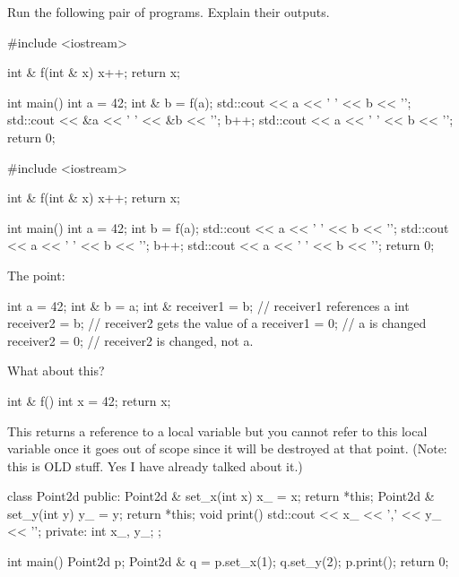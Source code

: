 Run the following pair of programs. Explain their outputs.

\begin{consolethree}[escapeinside=||]
#include <iostream>

int & f(int & x)
{
    x++;
    return x;
}

int main()
{
    int a = 42;
    int & b = f(a);
    std::cout << a << ' ' << b << '\n';
    std::cout << &a << ' ' << &b << '\n';
    b++;
    std::cout << a << ' ' << b << '\n';
    return 0;
}
\end{consolethree}

\begin{consolethree}[escapeinside=||]
#include <iostream>

int & f(int & x)
{
    x++;
    return x;
}

int main()
{
    int a = 42;
    int b = f(a);
    std::cout << a << ' ' << b << '\n';
    std::cout << a << ' ' << b << '\n';
    b++;
    std::cout << a << ' ' << b << '\n';
    return 0;
}
\end{consolethree}

The point:

\begin{consolethree}[escapeinside=||]
int a = 42;
int & b = a;
int & receiver1 = b;  // receiver1 references a
int receiver2 = b;    // receiver2 gets the value of a
receiver1 = 0;        // a is changed
receiver2 = 0;        // receiver2 is changed, not a.
\end{consolethree}

What about this?

\begin{consolethree}[escapeinside=||]
int & f()
{
    int x = 42;
    return x;
}
\end{consolethree}

This returns a reference to a local variable but you cannot refer to
this local variable once it goes out of scope since it will be destroyed
at that point. (Note: this is OLD stuff. Yes I have already talked about
it.)


\newpage{}

\begin{consolethree}[escapeinside=||]
class Point2d
{
public:
    Point2d & set_x(int x) { x_ = x; return *this; }
    Point2d & set_y(int y) { y_ = y; return *this; }
    void print()
    {
        std::cout << x_ << ',' << y_ << '\n';
    }
private:
    int x_, y_;
};

int main()
{
    Point2d p;
    Point2d & q = p.set_x(1);
    q.set_y(2);
    p.print();
    return 0;
}
\end{consolethree}

